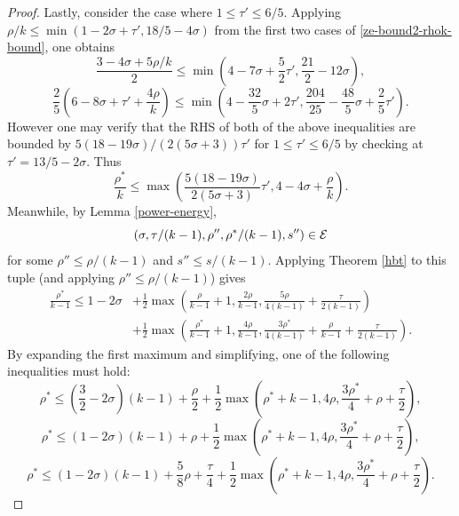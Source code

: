 \begin{proof}
Lastly, consider the case where $1 \le \tau' \le 6/5$. Applying $\rho/k \le \min(1 - 2\sigma + \tau', 18/5 - 4\sigma)$ from the first two cases of \eqref{ze-bound2-rhok-bound}, one obtains 
\[
    \frac{3 - 4\sigma + 5\rho/k}{2} \le \min\left(4 - 7\sigma + \frac{5}{2}\tau', \frac{21}{2} - 12\sigma\right),
\]
\[
    \frac{2}{5}(6 - 8\sigma + \tau' + \frac{4\rho}{k}) \le \min\left(4 - \frac{32}{5}\sigma + 2\tau', \frac{204}{25} - \frac{48}{5}\sigma + \frac{2}{5}\tau'\right).
\]
However one may verify that the RHS of both of the above inequalities are bounded by $5(18 - 19\sigma)/(2(5\sigma + 3))\tau'$ for $1 \le \tau' \le 6/5$ by checking at $\tau' = 13/5 - 2\sigma$. Thus 
\begin{equation}
    \label{ze-bound2-rhok-temp1}
    \frac{\rho^*}{k} \le \max\left(\frac{5(18 - 19\sigma)}{2(5\sigma + 3)}\tau', 4 - 4\sigma + \frac{\rho}{k}\right).
\end{equation}
Meanwhile, by Lemma \ref{power-energy},
\[
(\sigma, \tau/(k-1), \rho'', \rho^*/(k-1), s'')\in\mathcal{E}
\]
for some $\rho''\le\rho/(k-1)$ and $s''\le s/(k-1)$. Applying Theorem \ref{hbt} to this tuple (and applying $\rho''\le \rho/(k-1)$) gives
\begin{equation}\label{ze-bound2-rhostar-k1}
\begin{split}
\frac{\rho^*}{k - 1} \le 1-2\sigma &+ \frac{1}{2}\max(\frac{\rho}{k - 1}+1, \frac{2\rho}{k -1 }, \frac{5\rho}{4(k - 1)} + \frac{\tau}{2(k - 1)}) \\
&+ \frac{1}{2}\max(\frac{\rho^*}{k - 1}+1, \frac{4\rho}{k - 1}, \frac{3\rho^*}{4(k - 1)} +\frac{\rho}{k - 1}+\frac{\tau}{2(k-1)}).
\end{split}
\end{equation}
By expanding the first maximum and simplifying, one of the following inequalities must hold:
\begin{equation}\label{ze-bound2-rhostar-k1-case1}
    \rho^* \le (\frac{3}{2} - 2\sigma)(k - 1) + \frac{\rho}{2} + \frac{1}{2}\max(\rho^* + k - 1, 4\rho, \frac{3\rho^*}{4} + \rho + \frac{\tau}{2}),
\end{equation}
\begin{equation}\label{ze-bound2-rhostar-k1-case2}
\rho^* \le (1 - 2\sigma)(k - 1) + \rho + \frac{1}{2}\max(\rho^* + k - 1, 4\rho, \frac{3\rho^*}{4} + \rho + \frac{\tau}{2}),
\end{equation}
\begin{equation}\label{ze-bound2-rhostar-k1-case3}
\rho^* \le (1 - 2\sigma)(k - 1) + \frac{5}{8}\rho + \frac{\tau}{4} + \frac{1}{2}\max(\rho^* + k - 1, 4\rho, \frac{3\rho^*}{4} + \rho + \frac{\tau}{2}).

\end{equation}
\end{proof}
